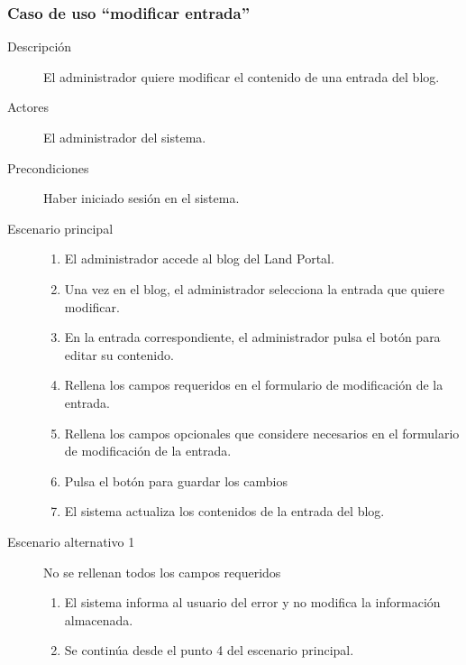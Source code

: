 \subsubsection{Caso de uso ``modificar entrada''}
\begin{description}
\item[Descripción] El administrador quiere modificar el contenido de una entrada del blog.
\item[Actores] El administrador del sistema.
\item[Precondiciones] Haber iniciado sesión en el sistema.
\item[Escenario principal] \hfill
						 	\begin{enumerate}
							\item El administrador accede al blog del Land Portal.
							\item Una vez en el blog, el administrador selecciona la entrada que quiere modificar.
							\item En la entrada correspondiente, el administrador pulsa el botón para editar su contenido.
							\item Rellena los campos requeridos en el formulario de modificación de la entrada.
							\item Rellena los campos opcionales que considere necesarios en el formulario de modificación de la entrada.
							\item Pulsa el botón para guardar los cambios
							\item El sistema actualiza los contenidos de la entrada del blog.
							\end{enumerate}
\item[Escenario alternativo 1]  No se rellenan todos los campos requeridos
							\begin{enumerate}
							\item El sistema informa al usuario del error y no modifica la información almacenada.
							\item Se continúa desde el punto 4 del escenario principal.
							\end{enumerate}
\end{description}

